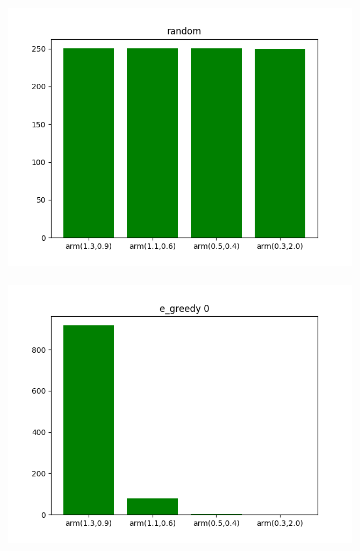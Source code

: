 \documentclass[letterpaper]{article}
\begin{document}
\begin{figure}[H]
  \begin{subfigure}{.5\textwidth}
    \centering
    \includegraphics[width=1\linewidth]{images/assign3/ex1/arms_random}
    \caption{}
    \label{fig:arms_random_ex1}
  \end{subfigure}
  \begin{subfigure}{.5\textwidth}
    \centering
    \includegraphics[width=1\linewidth]{images/assign3/ex1/arms_e_greedy0}
    \caption{}
    \label{fig:arms_e_greedy0_ex1}
  \end{subfigure}
  \begin{subfigure}{.5\textwidth}
    \centering

\end{subfigure}
\end{figure}
\end{document}
